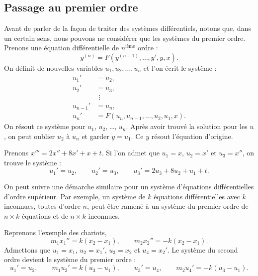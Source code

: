 \subsection{Passage au premier ordre}

Avant de parler de la façon de traiter des systèmes différentiels, notons que, dans un certain sens, nous pouvons ne considérer que les systèmes du premier ordre. Prenons une équation différentielle de $n^{\text{ième}}$ ordre :
\begin{equation*}
y^{(n)} = F(y^{(n-1)},\ldots,y',y,x) .
\end{equation*}
On définit de nouvelles variables $u_1, u_2, \ldots, u_n$ et l'on écrit le système :
\begin{align*}
u_1' & = u_2 , \\
u_2' & = u_3 , \\
& ~\, \vdots \\
u_{n-1}' & = u_n , \\
u_n' & = F(u_n,u_{n-1},\ldots,u_2,u_1,x) .
\end{align*}
On résout ce système pour $u_1$, $u_2$, \ldots, $u_n$. Après avoir trouvé la solution pour les $u$,
on peut oublier $u_2$ à $u_n$ et garder $y = u_1$.
Ce $y$ résout l'équation d'origine.

\begin{example}
Prenons $x''' = 2x''+ 8x' + x + t$. Si l'on admet que $u_1 = x$, $u_2 = x'$ et $u_3
= x''$, on trouve le système :
\begin{equation*}
u_1' = u_2, \qquad u_2' = u_3, \qquad u_3' = 2u_3 + 8u_2 + u_1 + t .
\end{equation*}
\end{example}

On peut suivre une démarche similaire pour un système d'équations différentielles d'ordre supérieur. Par exemple, un système de $k$ équations différentielles avec $k$
inconnues, toutes d'ordre $n$, peut être ramené à un système du premier ordre de 
$n \times k$
équations et de $n \times k$ inconnues.

\begin{example}
Reprenons l'exemple des chariots,
\begin{equation*}
m_1 x_1'' = k(x_2-x_1), \qquad m_2 x_2'' = - k(x_2-x_1) .
\end{equation*}
Admettons que $u_1 = x_1$, $u_2 = x_1'$, 
$u_3 = x_2$ et $u_4 = x_2'$. Le système du second ordre devient le système du premier ordre :
\begin{equation*}
u_1' = u_2, \qquad
m_1 u_2' = k(u_3-u_1), \qquad
u_3' = u_4, \qquad
m_2 u_4' = - k(u_3-u_1) .
\end{equation*}
\end{example}

